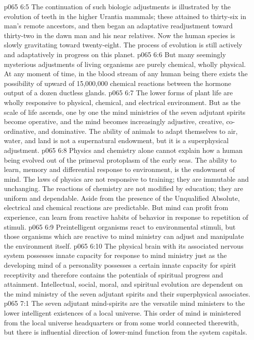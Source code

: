 \vs p065 6:5 The continuation of such biologic adjustments is illustrated by the evolution of teeth in the higher Urantia mammals; these attained to thirty\hyp{}six in man’s remote ancestors, and then began an adaptative readjustment toward thirty\hyp{}two in the dawn man and his near relatives. Now the human species is slowly gravitating toward twenty\hyp{}eight. The process of evolution is still actively and adaptatively in progress on this planet.
\vs p065 6:6 But many seemingly mysterious adjustments of living organisms are purely chemical, wholly physical. At any moment of time, in the blood stream of any human being there exists the possibility of upward of 15,000,000 chemical reactions between the hormone output of a dozen ductless glands.
\vs p065 6:7 \pc The lower forms of plant life are wholly responsive to physical, chemical, and electrical environment. But as the scale of life ascends, one by one the mind ministries of the seven adjutant spirits become operative, and the mind becomes increasingly adjustive, creative, co\hyp{}ordinative, and dominative. The ability of animals to adapt themselves to air, water, and land is not a supernatural endowment, but it is a superphysical adjustment.
\vs p065 6:8 Physics and chemistry alone cannot explain how a human being evolved out of the primeval protoplasm of the early seas. The ability to learn, memory and differential response to environment, is the endowment of mind. The laws of physics are not responsive to training; they are immutable and unchanging. The reactions of chemistry are not modified by education; they are uniform and dependable. Aside from the presence of the Unqualified Absolute, electrical and chemical reactions are predictable. But mind can profit from experience, can learn from reactive habits of behavior in response to repetition of stimuli.
\vs p065 6:9 Preintelligent organisms react to environmental stimuli, but those organisms which are reactive to mind ministry can adjust and manipulate the environment itself.
\vs p065 6:10 The physical brain with its associated nervous system possesses innate capacity for response to mind ministry just as the developing mind of a personality possesses a certain innate capacity for spirit receptivity and therefore contains the potentials of spiritual progress and attainment. Intellectual, social, moral, and spiritual evolution are dependent on the mind ministry of the seven adjutant spirits and their superphysical associates.
\vs p065 7:1 The seven adjutant mind\hyp{}spirits are the versatile mind ministers to the lower intelligent existences of a local universe. This order of mind is ministered from the local universe headquarters or from some world connected therewith, but there is influential direction of lower\hyp{}mind function from the system capitals.
